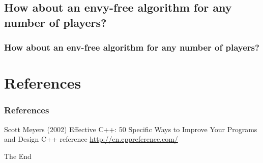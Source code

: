 \documentclass{beamer}
\begin{document}
\subsection{How about an envy-free algorithm for any number of players?}
\begin{frame}
\frametitle{How about an env-free algorithm for any number of players?}
\end{frame}


\section{References}
\begin{frame}
\frametitle{References}
\footnotesize{
\begin{thebibliography}{99} %
 Scott Meyers (2002)
\newblock Effective C++: 50 Specific Ways to Improve Your Programs and Design
 C++ reference
\newblock \url{http://en.cppreference.com/}
\end{thebibliography}
}
\end{frame}


\begin{frame}
\Huge{\centerline{The End}}
\end{frame}

\end{document}
